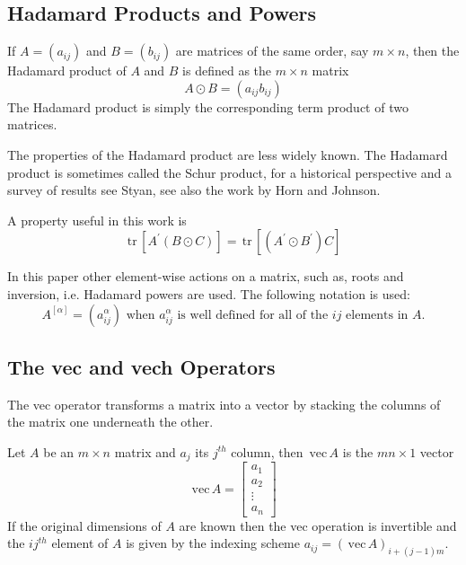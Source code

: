 \documentclass[12pt,thmsa,suthesis,verbatim]{report}
\begin{document}
\subsection{Hadamard Products and Powers}

If $A=\left( a_{ij}\right) $ and $B=\left( b_{ij}\right) $ are matrices of
the same order, say $m\times n$, then the Hadamard product of $A$ and $B$ is
defined as the $m\times n$ matrix 
\begin{equation}
A\odot B=\left( a_{ij}b_{ij}\right)
\end{equation}
The Hadamard product is simply the corresponding term product of two
matrices.

The properties of the Hadamard product are less widely known. The Hadamard
product is sometimes called the Schur product, for a historical perspective
and a survey of results see Styan\cite{Styan73}, see also the work by Horn
and Johnson\cite{HornJohnson91}.

A property useful in this work is 
\begin{equation}
\,\mathrm{tr}\,\left[ A^{\prime }\left( B\odot C\right) \right] =\,\mathrm{tr%
}\,\left[ \left( A^{\prime }\odot B^{\prime }\right) C\right]  \label{trhad}
\end{equation}
$\,$

In this paper other element-wise actions on a matrix, such as, roots and
inversion, i.e. Hadamard powers are used. The following notation is used: 
\begin{equation}
A^{\left[ \alpha \right] }=\left( a_{ij}^\alpha \right) \text{ when }%
a_{ij}^\alpha \text{ is well defined for all of the }ij\text{ elements in }A.
\end{equation}

\subsection{The vec and vech Operators}

The vec operator transforms a matrix into a vector by stacking the columns
of the matrix one underneath the other.

Let $A$ be an $m\times n$ matrix and $a_j$ its $j^{th}$ column, then $\,%
\mathrm{vec}\,A$ is the $mn\times 1$ vector 
\begin{equation}
\,\mathrm{vec}\,A=\left[ 
\begin{array}{c}
a_1 \\ 
a_2 \\ 
\vdots \\ 
a_n
\end{array}
\right]
\end{equation}
If the original dimensions of $A$ are known then the vec operation is
invertible and the $ij^{th}$ element of $A$ is given by the indexing scheme $%
a_{ij}=\left( \,\mathrm{vec}\,A\right) _{i+\left( j-1\right) m}$.
\end{document}
